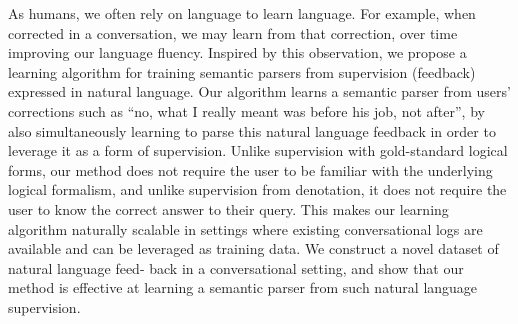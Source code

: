 As humans, we often rely on language to learn language.   For example,  when corrected in a conversation, we may learn from that correction,  over  time  improving  our  language  fluency.   Inspired  by  this  observation,  we  propose a learning algorithm for training semantic parsers from supervision (feedback) expressed in  natural  language. Our  algorithm  learns  a semantic  parser  from  users'  corrections  such as ``no,  what  I  really  meant  was  before  his job, not after'', by also simultaneously learning to parse this natural language feedback in order to leverage it as a form of supervision. Unlike supervision with gold-standard logical forms, our method does not require the user to be familiar with the underlying logical formalism,  and unlike supervision from denotation, it does not require the user to know the correct answer to their query. This makes our learning algorithm naturally scalable in settings where existing conversational logs are available and can  be  leveraged  as  training  data.   We  construct a novel dataset of natural language feed- back in a conversational setting, and show that our method is effective at learning a semantic parser from such natural language supervision.
